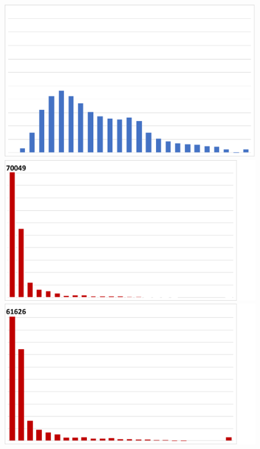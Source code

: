 \begin{figure}
\begin{minipage}[t]{0.33\linewidth}
\begin{framed}
\begin{minipage}[t]{0.49\textwidth}
\vspace{-3mm}
\end{minipage}%
\hfill
\begin{minipage}[t]{0.49\textwidth}%
\centering
\includegraphics[width=0.95\linewidth]{results/sw4/Eul2_Max.pdf}
\vspace{-3mm}
\end{minipage}
\begin{minipage}[t]{0.49\textwidth}%
\centering
\includegraphics[width=0.95\linewidth, trim={0cm 0cm 2.5cm 0cm}, clip]{results/sw4/Lag3_AvgL2.pdf}
\vspace{-3mm}
\end{minipage}%
\hfill
\begin{minipage}[t]{0.49\textwidth}%
\centering
\includegraphics[width=0.95\linewidth, trim={0cm 0cm 2.5cm 0cm}, clip]{results/sw4/Lag4_AvgL2.pdf}

\end{minipage}
\end{framed}
\end{minipage}
\end{figure}
